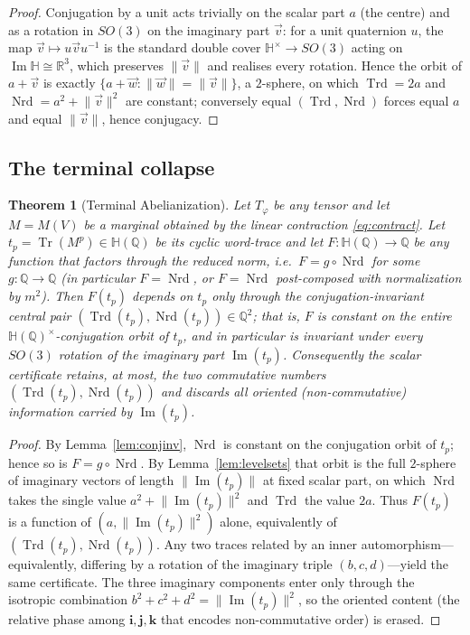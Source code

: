 \documentclass[pdflatex,sn-mathphys-num]{sn-jnl}
\theoremstyle{thmstyleone}%
\newtheorem{theorem}{Theorem}%
\theoremstyle{thmstyletwo}%
\theoremstyle{thmstylethree}%
\newcommand{\HH}{\mathbb{H}}
\newcommand{\QQ}{\mathbb{Q}}
\newcommand{\RR}{\mathbb{R}}
\newcommand{\Nrd}{\operatorname{Nrd}}
\newcommand{\Trd}{\operatorname{Trd}}
\newcommand{\Tr}{\operatorname{Tr}}
\newcommand{\bi}{\mathbf{i}}
\newcommand{\bj}{\mathbf{j}}
\newcommand{\bk}{\mathbf{k}}
\newcommand{\Tphi}{T_{\varphi}}
\DeclareMathOperator{\im}{Im}
\begin{document}
\begin{proof}
Conjugation by a unit acts trivially on the scalar part $a$ (the centre)
and as a rotation in $SO(3)$ on the imaginary part $\vec v$: for a unit
quaternion $u$, the map $\vec v\mapsto u\vec vu^{-1}$ is the standard
double cover $\HH^{\times}\to SO(3)$ acting on $\im\HH\cong\RR^3$, which
preserves $\lVert\vec v\rVert$ and realises every rotation. Hence the orbit
of $a+\vec v$ is exactly $\{a+\vec w:\lVert\vec w\rVert=\lVert\vec
v\rVert\}$, a $2$-sphere, on which $\Trd=2a$ and
$\Nrd=a^2+\lVert\vec v\rVert^2$ are constant; conversely equal
$(\Trd,\Nrd)$ forces equal $a$ and equal $\lVert\vec v\rVert$, hence
conjugacy.
\end{proof}

\subsection{The terminal collapse}

\begin{theorem}[Terminal Abelianization]\label{thm:terminal}
Let $\Tphi$ be any tensor and let $M=M(V)$ be a marginal obtained by the
linear contraction \eqref{eq:contract}. Let $t_p=\Tr(M^p)\in\HH(\QQ)$ be its
cyclic word-trace and let $F:\HH(\QQ)\to\QQ$ be any function that factors
through the reduced norm, i.e.\ $F=g\circ\Nrd$ for some $g:\QQ\to\QQ$ (in
particular $F=\Nrd$, or $F=\Nrd$ post-composed with normalization by
$m^2$). Then $F(t_p)$ depends on $t_p$ only through the
conjugation-invariant central pair $(\Trd(t_p),\Nrd(t_p))\in\QQ^2$; that is,
$F$ is constant on the entire $\HH(\QQ)^{\times}$-conjugation orbit of
$t_p$, and in particular is invariant under every $SO(3)$ rotation of the
imaginary part $\im(t_p)$. Consequently the scalar certificate retains, at
most, the two commutative numbers $(\Trd(t_p),\Nrd(t_p))$ and discards all
oriented (non-commutative) information carried by $\im(t_p)$.
\end{theorem}

\begin{proof}
By Lemma~\ref{lem:conjinv}, $\Nrd$ is constant on the conjugation orbit of
$t_p$; hence so is $F=g\circ\Nrd$. By Lemma~\ref{lem:levelsets} that orbit
is the full $2$-sphere of imaginary vectors of length
$\lVert\im(t_p)\rVert$ at fixed scalar part, on which $\Nrd$ takes the
single value $a^2+\lVert\im(t_p)\rVert^2$ and $\Trd$ the value $2a$. Thus
$F(t_p)$ is a function of $(a,\lVert\im(t_p)\rVert^2)$ alone, equivalently
of $(\Trd(t_p),\Nrd(t_p))$. Any two traces related by an inner
automorphism---equivalently, differing by a rotation of the imaginary
triple $(b,c,d)$---yield the same certificate. The three imaginary
components enter only through the isotropic combination
$b^2+c^2+d^2=\lVert\im(t_p)\rVert^2$, so the oriented content (the relative
phase among $\bi,\bj,\bk$ that encodes non-commutative order) is erased.
\end{proof}
\end{document}
